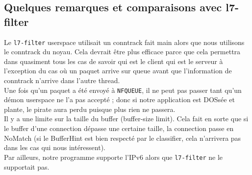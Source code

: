 \subsection{Quelques remarques et comparaisons avec l7-filter}
Le \verb+l7-filter+ userspace utilisait un conntrack fait main alors que nous utilisons le conntrack du noyau. Cela devrait être plus efficace parce que cela permettra dans quasiment tous les cas de savoir qui est le client qui est le serveur à l'exception du cas où un paquet arrive sur \og queue \fg{} avant que l'information de conntrack n'arrive dans l'autre thread.\\

Une fois qu'un paquet a été envoyé à \verb+NFQUEUE+, il ne peut pas passer
tant qu'un démon userspace ne l'a pas accepté ; donc si notre application est
DOSsée et plante, le pirate aura perdu puisque plus rien ne passera.\\

Il y a une limite sur la taille du buffer (buffer-size limit). Cela fait en sorte que si le
buffer d'une connection dépasse une certaine taille, la connection
passe en NoMatch (si le BufferHint est bien respecté par le
classifier, cela n'arrivera pas dans les cas qui nous intéressent).\\

Par ailleurs, notre programme supporte l'IPv6 alors que \verb+l7-filter+ ne le supportait pas.
